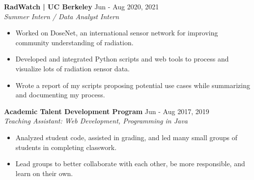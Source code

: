 \documentclass[letterpaper,10pt]{extarticle}
\begin{document}

\noindent
\textbf{RadWatch | UC Berkeley} \hfill Jun - Aug 2020, 2021 \\
\textit{Summer Intern / Data Analyst Intern}%
\begin{itemize}
    \item Worked on DoseNet, an international sensor network for improving community understanding of radiation.
    \item Developed and integrated Python scripts and web tools to process and visualize lots of radiation sensor data.
    \item Wrote a report of my scripts proposing potential use cases while summarizing and documenting my process.
\end{itemize}

\noindent
\textbf{Academic Talent Development Program} \hfill Jun - Aug 2017, 2019\\ %
\textit{Teaching Assistant: Web Development, Programming in Java} \hfill %
\begin{itemize}
    \item Analyzed student code, assisted in grading, and led many small groups of students in completing classwork.
    \item Lead groups to better collaborate with each other, be more responsible, and learn on their own.
\end{itemize}
\end{document}
